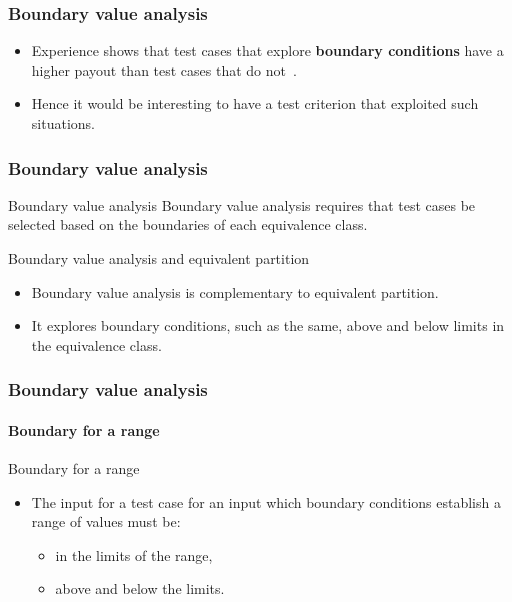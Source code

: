 \begin{frame}[hasprev=false, hasnext=true, parent={concept:functional-testing}]
\frametitle{Boundary value analysis}

\begin{block:fact}{}
\begin{itemize}
	\item Experience shows that test cases that explore \textbf{boundary
	conditions} have a higher payout than test cases that do
	not~\cite[p. 59]{myers:2004}.

	\item Hence it would be interesting to have a test criterion that
	exploited such situations.
\end{itemize}
\end{block:fact}
\end{frame}


\begin{frame}[hasprev=true, hasnext=true]
\frametitle{Boundary value analysis}
\label{concept:boundary-value-analysis}

\begin{block:concept}{Boundary value analysis}
Boundary value analysis requires that test cases be selected based on the
boundaries of each equivalence class.
\end{block:concept}

\begin{block:fact}{Boundary value analysis and equivalent partition}
\begin{itemize}
	\item Boundary value analysis is complementary to equivalent partition.

	\item It explores boundary conditions, such as the same, above and below
	limits in the equivalence class.
\end{itemize}
\end{block:fact}
\end{frame}


\begin{frame}
\frametitle{Boundary value analysis}
\framesubtitle{Boundary for a range}

\begin{block:fact}{Boundary for a range}
\begin{itemize}
	\item The input for a test case for an input which boundary conditions
	establish a range of values must be:
	\begin{itemize}
		\item in the limits of the range,
		\item above and below the limits.
	\end{itemize}
\end{itemize}
\end{block:fact}
\end{frame}


